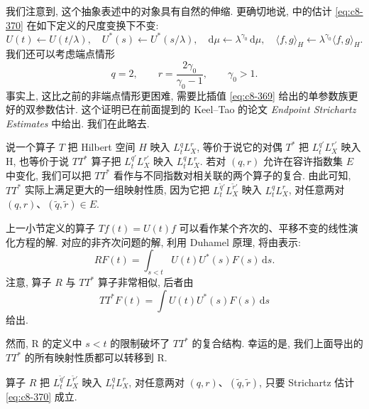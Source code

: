 \begin{remark}\label{rem:c8-0.53}
我们注意到, 这个抽象表述中的对象具有自然的伸缩. 更确切地说,  中的估计 \eqref{eq:c8-370} 在如下定义的尺度变换下不变:
\begin{equation}
U(t)\leftarrow U(t/\lambda), \quad U^{*}(s)\leftarrow U^{*}(s/\lambda), \quad \mathrm{d}\mu\leftarrow\lambda^{\gamma_0}\, \mathrm{d}\mu, \quad \langle f, g\rangle_H\leftarrow\lambda^{\gamma_0}\langle f, g\rangle_H.\label{eq:c8-379}
\end{equation}
我们还可以考虑端点情形
\[
q=2, \qquad r=\frac{2\gamma_0}{\gamma_0-1}, \qquad \gamma_0>1.
\]
事实上, 这比之前的非端点情形更困难, 需要比插值 \eqref{eq:c8-369} 给出的单参数族更好的双参数估计. 这个证明已在前面提到的 Keel--Tao 的论文 \emph{Endpoint Strichartz Estimates} 中给出. 我们在此略去. 
\end{remark}


说一个算子 $T$ 把 Hilbert 空间 $H$ 映入 $L_t^q L_X^r$, 等价于说它的对偶 $T^{*}$ 把 $L_t^{q'} L_X^{r'}$ 映入 H, 也等价于说 $TT^{*}$ 算子把 $L_t^{q'} L_X^{r'}$ 映入 $L_t^q L_X^r$. 若对 $(q, r)$ 允许在容许指数集 $E$ 中变化, 我们可以把 $TT^{*}$ 看作与不同指数对相关联的两个算子的复合. 由此可知, $TT^{*}$ 实际上满足更大的一组映射性质, 因为它把 $L_t^{\widetilde{q}'} L_X^{\widetilde{r}'}$ 映入 $L_t^q L_X^r$, 对任意两对 $(q, r)$、$(\widetilde{q}, \widetilde{r})\in E$. 

上一小节定义的算子 $Tf(t)=U(t)f$ 可以看作某个齐次的、平移不变的线性演化方程的解. 对应的非齐次问题的解, 利用 Duhamel 原理, 将由表示:
\[
RF(t)=\int_{s<t}U(t)U^{*}(s)F(s)\, \mathrm{d}s .
\]
注意, 算子 $R$ 与 $TT^{*}$ 算子非常相似, 后者由
\[
TT^{*}F(t)=\int U(t)U^{*}(s)F(s)\, \mathrm{d}s
\]
给出. 

然而, R 的定义中 $s<t$ 的限制破坏了 $TT^{*}$ 的复合结构. 幸运的是, 我们上面导出的 $TT^{*}$ 的所有映射性质都可以转移到 R. 

\begin{theorem}\label{thm:c8-0.55}
算子 $R$ 把 $L_t^{\widetilde{q}'} L_X^{\widetilde{r}'}$ 映入 $L_t^q L_X^r$, 对任意两对 $(q, r)$、$(\widetilde{q}, \widetilde{r})$, 只要 Strichartz 估计 \eqref{eq:c8-370} 成立. 
\end{theorem}

